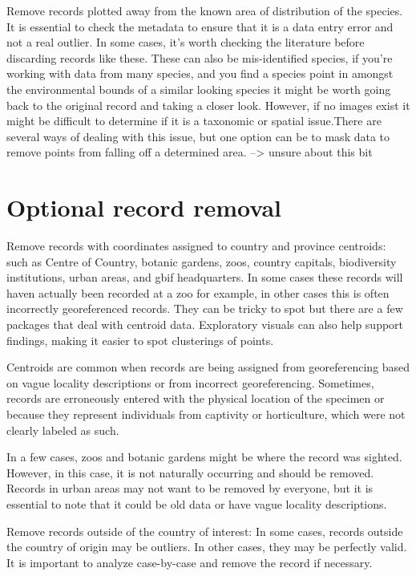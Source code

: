 \documentclass[
  letterpaper,
  DIV=11,
  numbers=noendperiod,
  oneside]{scrreprt}
\begin{document}
Remove records plotted away from the known area of distribution of the
species. It is essential to check the metadata to ensure that it is a
data entry error and not a real outlier. In some cases, it's worth
checking the literature before discarding records like these. These can
also be mis-identified species, if you're working with data from many
species, and you find a species point in amongst the environmental
bounds of a similar looking species it might be worth going back to the
original record and taking a closer look. However, if no images exist it
might be difficult to determine if it is a taxonomic or spatial
issue.There are several ways of dealing with this issue, but one option
can be to mask data to remove points from falling off a determined area.
--\textgreater{} unsure about this bit

\hypertarget{optional-record-removal}{%
\section{Optional record removal}\label{optional-record-removal}}

Remove records with coordinates assigned to country and province
centroids: such as Centre of Country, botanic gardens, zoos, country
capitals, biodiversity institutions, urban areas, and gbif headquarters.
In some cases these records will haven actually been recorded at a zoo
for example, in other cases this is often incorrectly georeferenced
records. They can be tricky to spot but there are a few packages that
deal with centroid data. Exploratory visuals can also help support
findings, making it easier to spot clusterings of points.

Centroids are common when records are being assigned from georeferencing
based on vague locality descriptions or from incorrect georeferencing.
Sometimes, records are erroneously entered with the physical location of
the specimen or because they represent individuals from captivity or
horticulture, which were not clearly labeled as such.

In a few cases, zoos and botanic gardens might be where the record was
sighted. However, in this case, it is not naturally occurring and should
be removed. Records in urban areas may not want to be removed by
everyone, but it is essential to note that it could be old data or have
vague locality descriptions.

Remove records outside of the country of interest: In some cases,
records outside the country of origin may be outliers. In other cases,
they may be perfectly valid. It is important to analyze case-by-case and
remove the record if necessary.
\end{document}
